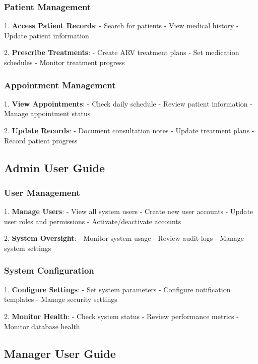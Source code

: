 \documentclass[12pt,a4paper]{article}
\begin{document}
\subsubsection{Patient Management}

1. \textbf{Access Patient Records}:
   - Search for patients
   - View medical history
   - Update patient information

2. \textbf{Prescribe Treatments}:
   - Create ARV treatment plans
   - Set medication schedules
   - Monitor treatment progress

\subsubsection{Appointment Management}

1. \textbf{View Appointments}:
   - Check daily schedule
   - Review patient information
   - Manage appointment status

2. \textbf{Update Records}:
   - Document consultation notes
   - Update treatment plans
   - Record patient progress

\subsection{Admin User Guide}

\subsubsection{User Management}

1. \textbf{Manage Users}:
   - View all system users
   - Create new user accounts
   - Update user roles and permissions
   - Activate/deactivate accounts

2. \textbf{System Oversight}:
   - Monitor system usage
   - Review audit logs
   - Manage system settings

\subsubsection{System Configuration}

1. \textbf{Configure Settings}:
   - Set system parameters
   - Configure notification templates
   - Manage security settings

2. \textbf{Monitor Health}:
   - Check system status
   - Review performance metrics
   - Monitor database health

\subsection{Manager User Guide}
\end{document}
